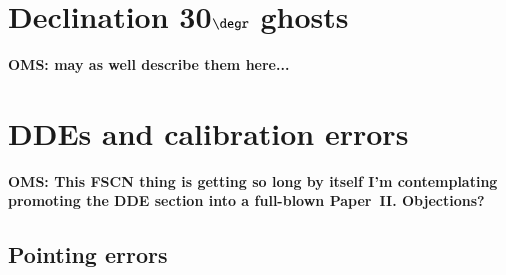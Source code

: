 \documentclass{aa}
\begin{document}
\begin{figure}
\end{figure}

\section{Declination 30$\degr$ ghosts}

{\bf OMS: may as well describe them here...}

\section{DDEs and calibration errors}
\label{sec:dde}

{\bf OMS: This FSCN thing is getting so long by itself I'm contemplating promoting the DDE section into a full-blown Paper~II. Objections?}

\subsection{Pointing errors}
\end{document}
